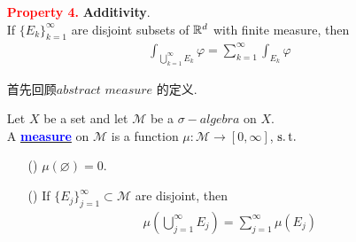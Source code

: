 \begin{enumerate}
		\vspace{2em}
		\begin{proof}
			Suppose
			\begin{align}
				\varphi = \sum_{k = 1}^{M}{a_k \chi_{E_k}} , \,\, \psi = \sum_{j = 1}^{N}{b_j \chi_{F_j}}
			\end{align}
			where both $\{ E_k \}_{k = 1}^{M}$ and $\{ F_j \}_{j = 1}^{N}$ are disjoint. Similar to the proof in Property 2, we get
			\begin{align}
				\psi - \varphi = \sum_{j , k}{(b_j - a_k) \chi_{E_k \cap F_j}}
			\end{align}
			Since $\varphi(x) \leq \psi(x)$, $\forall x \in \R^d$, then $\psi - \varphi$ is non-negative and simple. Therefore,
			\begin{align}
				\int{(\psi - \varphi)} = \sum_{j , k}{(b_j - a_k) m(E_k \cap F_j)} \geq 0 \,\, \Rightarrow \,\, \int{\varphi} \leq \int{\psi}
			\end{align}
		\end{proof}
	
		\vspace{2em}
		\item[\textcolor{red}{\textbf{Property 4.}}]\textbf{Additivity}.\\
		If $\{ E_k \}_{k = 1}^{\infty}$ are disjoint subsets of $\mathbb{R}^d$ with finite measure, then
		\begin{align}
			\int_{\bigcup_{k = 1}^{\infty}{E_k}}{\varphi} = \sum_{k = 1}^{\infty}{\int_{E_k}{\varphi}}
		\end{align}
		
		\vspace{2em}
		\begin{rmk}
			首先回顾$abstract$ $measure$ 的定义.
			\begin{defn}\label{def 3.1.2}
				Let $X$ be a set and let $\mathcal{M}$ be a $\sigma-algebra$ on $X$.\\
				A \underline{\textcolor{blue}{\textbf{measure}}} on $\mathcal{M}$ is a function $\mu : \mathcal{M} \longrightarrow [0 , \infty]$, $\operatorname{s.t.}$
				\begin{enumerate}
					\item[(\rmnum{1})]$\mu(\varnothing) = 0$.
					
					\item[(\rmnum{2})]If $\{ E_j \}_{j = 1}^{\infty} \subset \mathcal{M}$ are disjoint, then
					\begin{align}
						\mu(\bigcup_{j = 1}^{\infty}{E_j}) = \sum_{j = 1}^{\infty}{\mu(E_j)}
					\end{align}
				\end{enumerate}
			\end{defn}
			

\end{rmk}
\end{enumerate}
